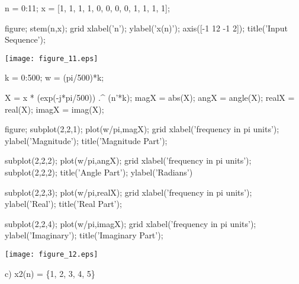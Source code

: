 \documentclass[12pt, onecolumn]{IEEEtran}
\begin{document}
	\begin{matlabcode}
		n = 0:11; 
		x = [1, 1, 1, 1, 0, 0, 0, 0, 1, 1, 1, 1];
		
		figure; stem(n,x); grid
		xlabel('n'); ylabel('x(n)');
		axis([-1 12 -1 2]); title('Input Sequence');
	\end{matlabcode}
	\begin{center}
		\texttt{[image: figure\_11.eps]}
	\end{center}
	\begin{matlabcode}
		
		k = 0:500; 
		w = (pi/500)*k;  
		
		X = x * (exp(-j*pi/500)) .^ (n'*k); %
		magX = abs(X); angX = angle(X);
		realX = real(X); imagX = imag(X);
		
		figure; subplot(2,2,1); plot(w/pi,magX); grid
		xlabel('frequency in pi units'); ylabel('Magnitude');
		title('Magnitude Part'); 
		
		subplot(2,2,2); plot(w/pi,angX); grid
		xlabel('frequency in pi units'); subplot(2,2,2); 
		title('Angle Part'); ylabel('Radians')
		
		subplot(2,2,3); plot(w/pi,realX); grid
		xlabel('frequency in pi units');  ylabel('Real');
		title('Real Part');
		
		subplot(2,2,4); plot(w/pi,imagX); grid
		xlabel('frequency in pi units'); ylabel('Imaginary');
		title('Imaginary Part'); 
	\end{matlabcode}
	\begin{center}
		\texttt{[image: figure\_12.eps]}
	\end{center}
	
	\begin{par}
		\begin{flushleft}
			c) x2(n) = \{1, 2, 3, 4, 5\} 
		\end{flushleft}
	\end{par}
	
\end{document}
